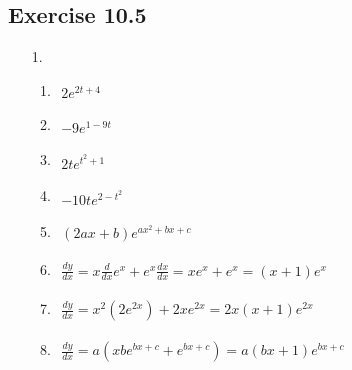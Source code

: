 \documentclass{./../../Latex/homework}
\begin{document}
\thispagestyle{plain}

\subsection*{Exercise 10.5} 

\begin{enumerate}

\item[1.] 
\begin{enumerate}
\item $\begin{aligned}2 e^{2 t+4}\end{aligned}$
\item $\begin{aligned}-9 e^{1-9 t}\end{aligned}$
\item $\begin{aligned}2 t e^{t^2+1}\end{aligned}$
\item $\begin{aligned}-10 t e^{2-t^2}\end{aligned}$
\item $\begin{aligned}(2 a x+b) e^{a x^2+b x+c}\end{aligned}$
\item $\begin{aligned}\frac{d y}{d x}=x \frac{d}{d x} e^x+e^x \frac{d x}{d x}=x e^x+e^x=(x+1) e^x\end{aligned}$
\item $\begin{aligned}\frac{d y}{d x}=x^2\left(2 e^{2 x}\right)+2 x e^{2 x}=2 x(x+1) e^{2 x}\end{aligned}$
\item $\begin{aligned}\frac{d y}{d x}=a\left(x b e^{b x+c}+e^{b x+c}\right)=a(b x+1) e^{b x+c}\end{aligned}$ \\~\\
\end{enumerate}


\end{enumerate}
\end{document}
